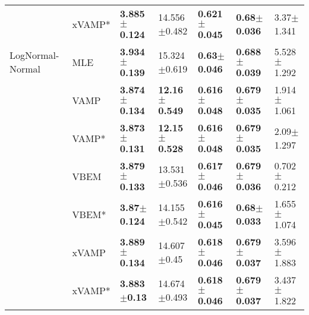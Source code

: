 \begin{tabular}{lllllll}
                 & xVAMP* &  \textbf{3.885$\pm$0.124} &           14.556$\pm$0.482 &  \textbf{0.621$\pm$0.045} &   \textbf{0.68$\pm$0.036} &            3.37$\pm$1.341 \\
LogNormal-Normal & MLE &  \textbf{3.934$\pm$0.139} &           15.324$\pm$0.619 &   \textbf{0.63$\pm$0.046} &  \textbf{0.688$\pm$0.039} &           5.528$\pm$1.292 \\
                 & VAMP &  \textbf{3.874$\pm$0.134} &   \textbf{12.16$\pm$0.549} &  \textbf{0.616$\pm$0.048} &  \textbf{0.679$\pm$0.035} &           1.914$\pm$1.061 \\
                 & VAMP* &  \textbf{3.873$\pm$0.131} &   \textbf{12.15$\pm$0.528} &  \textbf{0.616$\pm$0.048} &  \textbf{0.679$\pm$0.035} &            2.09$\pm$1.297 \\
                 & VBEM &  \textbf{3.879$\pm$0.133} &           13.531$\pm$0.536 &  \textbf{0.617$\pm$0.046} &  \textbf{0.679$\pm$0.036} &           0.702$\pm$0.212 \\
                 & VBEM* &   \textbf{3.87$\pm$0.124} &           14.155$\pm$0.542 &  \textbf{0.616$\pm$0.045} &   \textbf{0.68$\pm$0.033} &           1.655$\pm$1.074 \\
                 & xVAMP &  \textbf{3.889$\pm$0.134} &            14.607$\pm$0.45 &  \textbf{0.618$\pm$0.046} &  \textbf{0.679$\pm$0.037} &           3.596$\pm$1.883 \\
                 & xVAMP* &   \textbf{3.883$\pm$0.13} &           14.674$\pm$0.493 &  \textbf{0.618$\pm$0.046} &  \textbf{0.679$\pm$0.037} &           3.437$\pm$1.822 \\
\bottomrule
\end{tabular}

